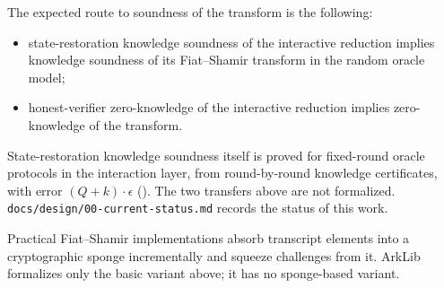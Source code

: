 \begin{remark}
    The expected route to soundness of the transform is the following:
    \begin{itemize}
        \item state-restoration knowledge soundness of the interactive reduction implies knowledge
        soundness of its Fiat--Shamir transform in the random oracle model;
        \item honest-verifier zero-knowledge of the interactive reduction implies zero-knowledge
        of the transform.
    \end{itemize}
    State-restoration knowledge soundness itself is proved for fixed-round oracle protocols in
    the interaction layer, from round-by-round knowledge certificates, with error $(Q + k)\cdot\epsilon$
    (). The two transfers above are not formalized. \texttt{docs/design/00-current-status.md}
    records the status of this work.
\end{remark}

\begin{remark}
    Practical Fiat--Shamir implementations absorb transcript elements into a cryptographic sponge
    incrementally and squeeze challenges from it. ArkLib formalizes only the basic variant above;
    it has no sponge-based variant.
\end{remark}
